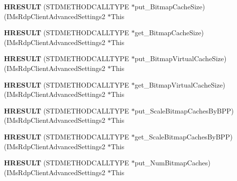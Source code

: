 \begin{DoxyCompactItemize}
{\bfseries H\+R\+E\+S\+U\+LT} (S\+T\+D\+M\+E\+T\+H\+O\+D\+C\+A\+L\+L\+T\+Y\+PE $\ast$put\+\_\+\+Bitmap\+Cache\+Size)(I\+Ms\+Rdp\+Client\+Advanced\+Settings2 $\ast$This
\item 
\mbox{\label{struct_i_ms_rdp_client_advanced_settings2_vtbl_aca5f076302d276adfef334bdf66eaf28}} 
{\bfseries H\+R\+E\+S\+U\+LT} (S\+T\+D\+M\+E\+T\+H\+O\+D\+C\+A\+L\+L\+T\+Y\+PE $\ast$get\+\_\+\+Bitmap\+Cache\+Size)(I\+Ms\+Rdp\+Client\+Advanced\+Settings2 $\ast$This
\item 
\mbox{\label{struct_i_ms_rdp_client_advanced_settings2_vtbl_a039f283e803a05cc85df021a0dd510e8}} 
{\bfseries H\+R\+E\+S\+U\+LT} (S\+T\+D\+M\+E\+T\+H\+O\+D\+C\+A\+L\+L\+T\+Y\+PE $\ast$put\+\_\+\+Bitmap\+Virtual\+Cache\+Size)(I\+Ms\+Rdp\+Client\+Advanced\+Settings2 $\ast$This
\item 
\mbox{\label{struct_i_ms_rdp_client_advanced_settings2_vtbl_a106b8da81b31c99a111e6b784be063b5}} 
{\bfseries H\+R\+E\+S\+U\+LT} (S\+T\+D\+M\+E\+T\+H\+O\+D\+C\+A\+L\+L\+T\+Y\+PE $\ast$get\+\_\+\+Bitmap\+Virtual\+Cache\+Size)(I\+Ms\+Rdp\+Client\+Advanced\+Settings2 $\ast$This
\item 
\mbox{\label{struct_i_ms_rdp_client_advanced_settings2_vtbl_af36077ca16e474e72d2243059e4e19e0}} 
{\bfseries H\+R\+E\+S\+U\+LT} (S\+T\+D\+M\+E\+T\+H\+O\+D\+C\+A\+L\+L\+T\+Y\+PE $\ast$put\+\_\+\+Scale\+Bitmap\+Caches\+By\+B\+PP)(I\+Ms\+Rdp\+Client\+Advanced\+Settings2 $\ast$This
\item 
\mbox{\label{struct_i_ms_rdp_client_advanced_settings2_vtbl_afee40966d6cdeabdb1b773ed841bcf9a}} 
{\bfseries H\+R\+E\+S\+U\+LT} (S\+T\+D\+M\+E\+T\+H\+O\+D\+C\+A\+L\+L\+T\+Y\+PE $\ast$get\+\_\+\+Scale\+Bitmap\+Caches\+By\+B\+PP)(I\+Ms\+Rdp\+Client\+Advanced\+Settings2 $\ast$This
\item 
\mbox{\label{struct_i_ms_rdp_client_advanced_settings2_vtbl_ad8d880eef450f203ae987fd8f20813bd}} 
{\bfseries H\+R\+E\+S\+U\+LT} (S\+T\+D\+M\+E\+T\+H\+O\+D\+C\+A\+L\+L\+T\+Y\+PE $\ast$put\+\_\+\+Num\+Bitmap\+Caches)(I\+Ms\+Rdp\+Client\+Advanced\+Settings2 $\ast$This

\end{DoxyCompactItemize}
